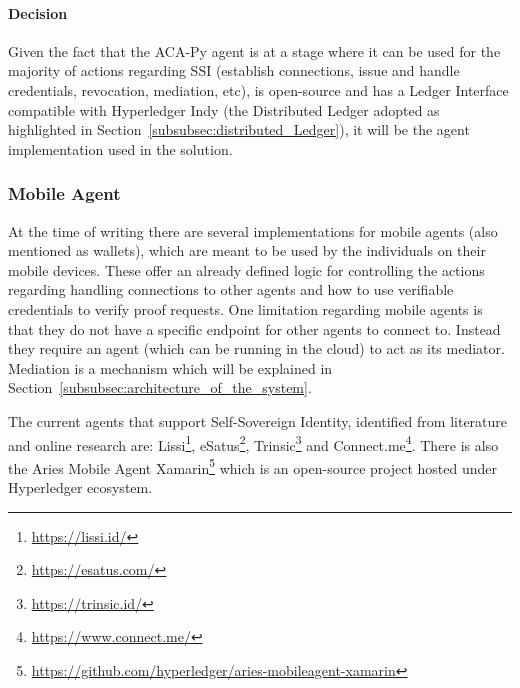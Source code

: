 
\paragraph{Decision}

Given the fact that the ACA-Py agent is at a stage where it can be used for the majority of actions regarding SSI (establish connections, issue and handle credentials, revocation, mediation, etc), is open-source and has a Ledger Interface compatible with Hyperledger Indy (the Distributed Ledger adopted as highlighted in Section~\ref{subsubsec:distributed_Ledger}), it will be the agent implementation used in the solution.

\subsubsection{Mobile Agent}
\label{subsubsec:mobile_agent}

At the time of writing there are several implementations for mobile agents (also mentioned as wallets), which are meant to be used by the individuals on their mobile devices. These offer an already defined logic for controlling the actions regarding handling connections to other agents and how to use verifiable credentials to verify proof requests. One limitation regarding mobile agents is that they do not have a specific endpoint for other agents to connect to. Instead they require an agent (which can be running in the cloud) to act as its mediator. Mediation is a mechanism which will be explained in Section~\ref{subsubsec:architecture_of_the_system}.

The current agents that support Self-Sovereign Identity, identified from literature and online research are: Lissi\footnote{\url{https://lissi.id/}}, eSatus\footnote{\url{https://esatus.com/}}, Trinsic\footnote{\url{https://trinsic.id/}} and Connect.me\footnote{\url{https://www.connect.me/}}. There is also the Aries Mobile Agent Xamarin\footnote{\url{https://github.com/hyperledger/aries-mobileagent-xamarin}} which is an open-source project hosted under Hyperledger ecosystem. 

